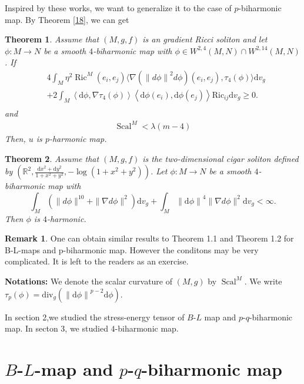 \documentclass[12pt,UTF8]{article}
\theoremstyle{plain}
\newtheorem{thm}{Theorem}[section]
\theoremstyle{definition}
\newtheorem{rem}{Remark}
\def\d {\mathrm{d}}
\def\Ric {\mathrm{Ric}}
\def\div{\mathrm{div}}
\def\na{\ensuremath{\nabla}}
\renewcommand{\d}[1]{\mathbb{#1}}
\renewcommand{\(}{\left(}
\renewcommand{\)}{\right)}
\renewcommand{\geq}{\geqslant}
\DeclareMathOperator*{\Scal}{Scal}
\newcommand{\norm}[1]{\left\lVert#1\right\rVert}%
\def\Ric{\mathrm{Ric\, }}
\numberwithin{equation}{subsection}
\def\na{\nabla}
\newcommand{\dv}{\operatorname{div}}
\renewcommand{\div}{\mbox{div }}
\renewcommand{\geq}{\geqslant}
\renewcommand{\(}{\left(}
\renewcommand{\)}{\right)}
\def\d{\mathrm{d}}
\def \d {\mathrm{d}}
\def \Ric {\mathrm{Ric}}
\def \div{\mathrm{div}}
\def\dv{\d v_g}
\numberwithin{equation}{section}
\begin{document}
	
	 Inspired by these works, we want to generalize it  to the case of $p$-biharmonic map. By Theorem \ref{18}, we can get 	
	\begin{thm}
		Assume that $(M,g,f)$ is an gradient Ricci soliton  and
		let $\phi\colon M\to N$ be a smooth $4$-biharmonic map  with $\phi\in W^{2,4}(M , N) \cap W^{2,14}(M , N)$.		If 
		\begin{equation}
			\begin{split}			
				&4\int_M\eta^2\operatorname{Ric}^M(e_i,e_j)\langle\na \left(\norm{d\phi}^{2} d\phi \right)(e_i,e_j),\tau_4(\phi)\rangle \d v_g \\
				&+2\int_M \left\langle \d \phi,\na \tau_4(\phi) \right\rangle\left\langle \d \phi(e_i),\d \phi(e_j) \right\rangle\Ric_{ij} \d v_g \geq 0.\\
			\end{split}
		\end{equation}
		and
		\begin{equation}
			\begin{split}
				\operatorname{Scal}^M<\lambda(m-4)
			\end{split}
		\end{equation}
		Then, $u$ is $p$-harmonic map.
	\end{thm}
	
	
	\begin{thm}\label{17}
		Assume that $(M, g, f)$ is the two-dimensional cigar soliton defined by $(\mathbb{R}^2, \frac{\d x^2+\d y^2}{1+x^2+y^2},-\log(1+x^2+y^2))$.
		Let $\phi: M \to N$ be a smooth $4$-biharmonic map with 
			\begin{equation}\label{18}
			\int_M(\|d\phi\|^{10}+\|\na d\phi\|^2)\dv+\int_M\norm{\d \phi}^{4} \|\na d\phi\|^2 \dv<\infty.
		\end{equation} Then $\phi$ is $4$-harmonic.
	\end{thm}
	\begin{rem}
		One can obtain similar  results to Theorem 1.1 and Theorem 1.2 for B-L-maps and p-biharmonic map. However the conditons may be very complicated. It is left to the readers as an exercise.
	\end{rem}
	
	
	{\bf Notations:} We denote the scalar curvature of $(M,g)$  by $\Scal^M$. We write $\tau_p(\phi)=\div_g(\norm{\d \phi}^{p-2}\d \phi)$.


In section 2,we studied  the stress-energy tensor of $B$-$L$ map and $p$-$q$-biharmonic map. In secton 3, we studied $4$-biharmonic map.
\section{$B$-$L$-map and $p $-$q$-biharmonic map}
\end{document}
